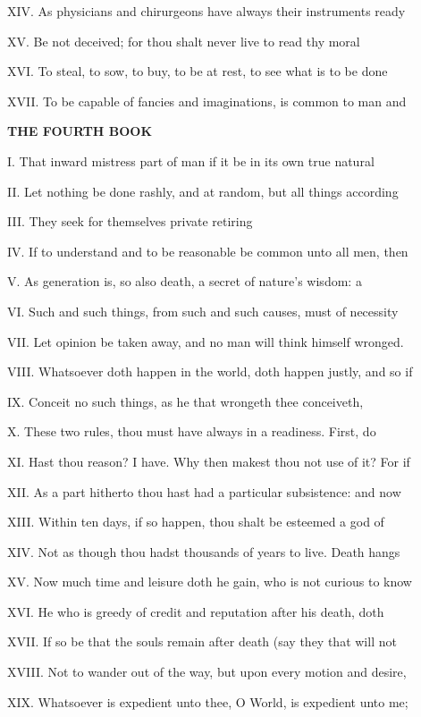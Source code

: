 XIV. As physicians and chirurgeons have always
their instruments ready

XV. Be not deceived; for thou shalt never live
to read thy moral

XVI. To steal, to sow, to buy, to be at rest,
to see what is to be done

XVII. To be capable of fancies and
imaginations, is common to man and

\textbf{THE FOURTH BOOK}

I. That inward mistress part of man if it be
in its own true natural

II. Let nothing be done rashly, and at random,
but all things according

III. They seek for themselves private retiring

IV. If to understand and to be reasonable be
common unto all men, then

V. As generation is, so also death, a secret
of nature's wisdom: a

VI. Such and such things, from such and such
causes, must of necessity

VII. Let opinion be taken away, and no man
will think himself wronged.

VIII. Whatsoever doth happen in the world,
doth happen justly, and so if

IX. Conceit no such things, as he that
wrongeth thee conceiveth,

X. These two rules, thou must have always in a
readiness. First, do

XI. Hast thou reason? I have. Why then makest
thou not use of it? For if

XII. As a part hitherto thou hast had a
particular subsistence: and now

XIII. Within ten days, if so happen, thou
shalt be esteemed a god of

XIV. Not as though thou hadst thousands of
years to live. Death hangs

XV. Now much time and leisure doth he gain,
who is not curious to know

XVI. He who is greedy of credit and reputation
after his death, doth

XVII. If so be that the souls remain after
death (say they that will not

XVIII. Not to wander out of the way, but upon
every motion and desire,

XIX. Whatsoever is expedient unto thee, O
World, is expedient unto me;

